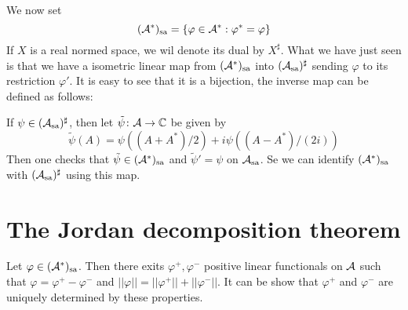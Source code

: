 \documentclass[10pt,english,a4paper]{article}
\theoremstyle{definition}
\def\Assa{\As_{\text{sa}}}
\def\sa{\text{sa}}
\def\vphi{\varphi}
\begin{document}
We now set 
\[  (\As^*)_{\text{sa}} = \{ \vphi \in \As^* : \vphi^* = \vphi \}\]
If $X$ is a real normed space, we wil denote its dual by $X^{\sharp}$.
What we have just seen is that we have a isometric linear map from 
$(\mathcal{A}^*)_{\text{sa}}$ into $(\Assa)^{\sharp}$ sending $\vphi$ to its restriction
$\vphi'$. It is easy to see that it is a bijection,
the inverse map can be defined as follows: 

If $\psi \in (\Assa)^{\sharp}$, then let $\tilde{\psi} \colon \mathcal{A} \to \mathbb{C}$ be 
given by 
\[ \tilde{\psi}(A) = \psi((A+A^*)/2) + i\psi((A-A^*)/(2i))  \]
Then one checks that $\tilde{\psi} \in (\mathcal{A}^*)_{\text{sa}}$ and
$\tilde{\psi}'=\psi$ on $\Assa$. Se we can identify 
$(\mathcal{A}^*)_{\text{sa}}$ with $(\Assa)^{\sharp}$ using this map. 

\section{The Jordan decomposition theorem}
Let $\vphi \in (\As^*)_{\sa}$. Then there exits $\vphi^+,\vphi^-$
positive linear functionals on $\mathcal{A}$ such that 
$\vphi = \vphi^+ - \vphi^-$ and 
$||\vphi|| = ||\vphi^+|| + ||\vphi^-||$.
It can be show that $\vphi^+$ and $\vphi^-$ are uniquely determined by these
properties. 
\end{document}
